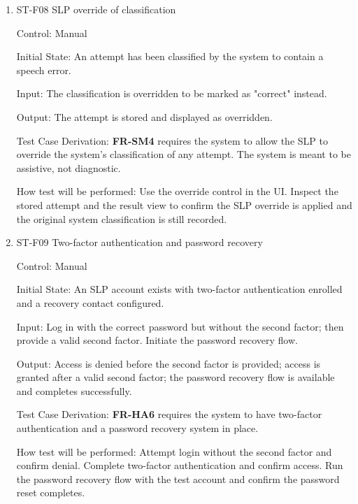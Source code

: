 \documentclass[12pt, titlepage]{article}
\begin{document}
\begin{enumerate}
Output: Each attempt stores its selected support level and associates it with the correct attempt.

Test Case Derivation: \textbf{FR-SM3} requires the system to record whether the target was produced independently, after a semantic cue, 
or after repetition.

How test will be performed: Set the support level for each attempt through the UI. Query the attempt records and verify each stored 
support level matches the attempt it was entered for.

\item{ST-F08 SLP override of classification\\}

Control: Manual

Initial State: An attempt has been classified by the system to contain a speech error.

Input: The classification is overridden to be marked as "correct" instead.

Output: The attempt is stored and displayed as overridden.

Test Case Derivation: \textbf{FR-SM4} requires the system to allow the SLP to override the system's classification of any attempt. 
The system is meant to be assistive, not diagnostic.

How test will be performed: Use the override control in the UI. Inspect the stored attempt and the result view to confirm the SLP 
override is applied and the original system classification is still recorded.

\item{ST-F09 Two-factor authentication and password recovery\\}

Control: Manual

Initial State: An SLP account exists with two-factor authentication enrolled and a recovery contact configured.

Input: Log in with the correct password but without the second factor; then provide a valid second factor. Initiate the password 
recovery flow.

Output: Access is denied before the second factor is provided; access is granted after a valid second factor; the password recovery 
flow is available and completes successfully.

Test Case Derivation: \textbf{FR-HA6} requires the system to have two-factor authentication and a password recovery system in place.

How test will be performed: Attempt login without the second factor and confirm denial. Complete two-factor authentication and 
confirm access. Run the password recovery flow with the test account and confirm the password reset completes.


\end{enumerate}
\end{document}
